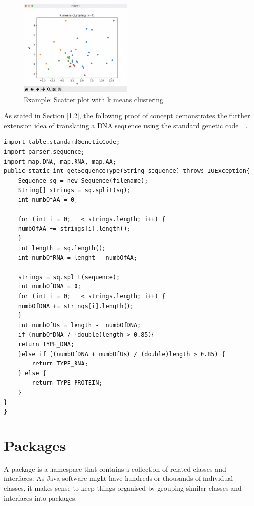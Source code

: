 \documentclass[]{final_report}
\begin{document}
\begin{figure}[H]
\centering
     \includegraphics[width=0.5\textwidth]{Scatter Plot.png}
      \caption{Example: Scatter plot with k means clustering}
       \label{fig:scatter_plot}
\end{figure}

As stated in Section \ref{1.2}, the following proof of concept demonstrates the further extension idea of translating a DNA sequence using the standard genetic code~\cite{lesk2019introduction}~\cite{bal2007java}.


\begin{verbatim} 
import table.standardGeneticCode;
import parser.sequence;
import map.DNA, map.RNA, map.AA;
public static int getSequenceType(String sequence) throws IOException{
    Sequence sq = new Sequence(filename);
    String[] strings = sq.split(sq);
    int numbOfAA = 0; 
    
    for (int i = 0; i < strings.length; i++) { 
    numbOfAA += strings[i].length(); 
    }
    int length = sq.length();
    int numbOfRNA = lenght - numbOfAA;
    
    strings = sq.split(sequence);
    int numbOfDNA = 0;
    for (int i = 0; i < strings.length; i++) { 
    numbOfDNA += strings[i].length();
    }
    int numbOfUs = length -  numbOfDNA;
    if (numbOfDNA / (double)length > 0.85){
    return TYPE_DNA;
    }else if ((numbOfDNA + numbOfUs) / (double)length > 0.85) {
        return TYPE_RNA;
    } else {
        return TYPE_PROTEIN;
    }
}
} 
\end{verbatim}

\section{Packages}
A package is a namespace that contains a collection of related classes and interfaces. As Java software might have hundreds or thousands of individual classes, it makes sense to keep things organised by grouping similar classes and interfaces into packages.
\end{document}
